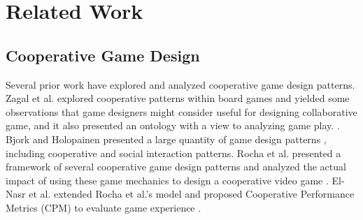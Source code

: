 \section{Related Work}

\subsection{Cooperative Game Design}



Several prior work have explored and analyzed cooperative game design patterns. Zagal et al. explored cooperative patterns within board games and yielded some observations that game designers might consider useful for designing collaborative game\cite{CG1}, and it also presented an ontology with a view to analyzing game play. \cite{CG3}. 
Bjork and Holopainen presented a large quantity of game design patterns \cite{CG2}, including cooperative and social interaction patterns.
Rocha et al. presented a framework of several cooperative game design patterns and analyzed the actual impact of using these game mechanics to design a cooperative video game \cite{CG4}.
El-Nasr et al. extended Rocha et al.'s model and proposed Cooperative Performance Metrics (CPM) to evaluate game experience \cite{CPMs}.

